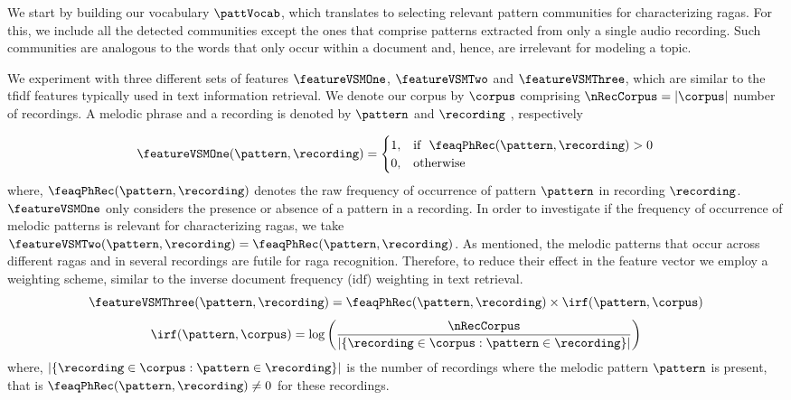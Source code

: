 We start by building our vocabulary $\pattVocab$, which translates to selecting relevant pattern communities for characterizing \glspl{raga}. For this, we include all the detected communities except the ones that comprise patterns extracted from only a single audio recording. Such communities are analogous to the words that only occur within a document and, hence, are irrelevant for modeling a topic.%

We experiment with three different sets of features $\featureVSMOne$, $\featureVSMTwo$ and $\featureVSMThree$, which are similar to the \gls{tfidf} features typically used in text information retrieval. We denote our corpus by $\corpus$  comprising $\nRecCorpus = |\corpus|$ number of recordings. A melodic phrase and a recording is denoted by $\pattern$ and $\recording$ , respectively

\begin{equation}
\featureVSMOne(\pattern,\recording)= 
\begin{cases}
1				,& \text{if}~~\feaqPhRec(\pattern,\recording) > 0\\
0,              & \text{otherwise}
\end{cases}
\end{equation}
where, $\feaqPhRec(\pattern,\recording)$ denotes the raw frequency of occurrence of pattern $\pattern$ in recording $\recording$. $\featureVSMOne$ only considers the presence or absence of a pattern in a recording. In order to investigate if the frequency of occurrence of melodic patterns is relevant for characterizing \glspl{raga}, we take $\featureVSMTwo(\pattern,\recording) = \feaqPhRec(\pattern,\recording)$. As mentioned, the melodic patterns that occur across different \glspl{raga} and in several recordings are futile for \gls{raga} recognition. Therefore, to reduce their effect in the feature vector we employ a weighting scheme, similar to the inverse document frequency ($\mathrm{idf}$) weighting in text retrieval.
\begin{equation}
\featureVSMThree(\pattern,\recording) = \feaqPhRec(\pattern,\recording) \times \irf(\pattern,\corpus)
\end{equation}
\begin{equation}
\irf(\pattern,\corpus) = \log \left( \frac{\nRecCorpus}{ |\lbrace \recording \in \corpus: \pattern \in \recording \rbrace|} \right)
\end{equation}
where, $|\lbrace \recording \in \corpus: \pattern \in \recording \rbrace|$ is the number of recordings where the melodic pattern $\pattern$ is present, that is $\feaqPhRec(\pattern,\recording)\neq 0$ for these recordings. 


